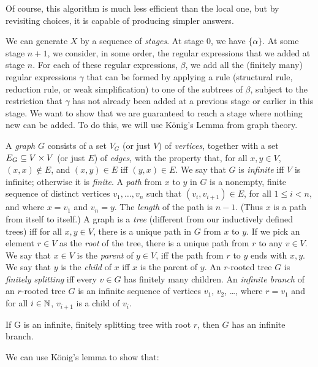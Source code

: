 Of course, this algorithm is much less efficient than the local one,
but by revisiting choices, it is capable of producing simpler answers.

We can generate $X$ by a sequence of \emph{stages}. At stage $0$, we
have $\{\alpha\}$. At some stage $n+1$, we consider, in some order,
the regular expressions that we added at stage $n$. For each of these
regular expressions, $\beta$, we add all the (finitely many) regular
expressions $\gamma$ that can be formed by applying a rule (structural
rule, reduction rule, or weak simplification) to one of the subtrees
of $\beta$, subject to the restriction that $\gamma$ has not already
been added at a previous stage or earlier in this stage.  We want to
show that we are guaranteed to reach a stage where nothing new can be
added. To do this, we will use K\"onig's Lemma
%
from graph theory.

A \emph{graph} $G$ consists of a set $V_G$ (or just $V$) of
\emph{vertices}, together with a set $E_G\subseteq V\times V$ (or just $E$) of
\emph{edges}, with the property that, for all $x, y\in V$,
$(x, x)\not\in E$, and $(x,y)\in E$ iff $(y, x)\in E$.  We say that
$G$ is \emph{infinite} iff $V$ is infinite; otherwise it is
\emph{finite}.  A \emph{path} from $x$ to $y$ in $G$ is a nonempty,
finite sequence of distinct vertices $v_1,\ldots,v_n$ such that
$(v_i, v_{i + 1})\in E$, for all $1\leq i < n$, and where $x = v_1$
and $v_n = y$. The \emph{length} of the path is $n-1$.  (Thus $x$ is a
path from itself to itself.) A graph is a \emph{tree} (different from
our inductively defined trees) iff for all $x,y\in V$, there is a
unique path in $G$ from $x$ to $y$. If we pick an element $r\in V$ as
the \emph{root} of the tree, there is a unique path from $r$ to any
$v\in V$. We say that $x\in V$ is the \emph{parent} of $y\in V$, iff
the path from $r$ to $y$ ends with $x, y$. We say that $y$ is the
\emph{child} of $x$ iff $x$ is the parent of $y$.  An $r$-rooted tree
$G$ is \emph{finitely splitting} iff every $v\in G$ has finitely many
children.  An \emph{infinite branch} of an $r$-rooted tree $G$ is an
infinite sequence of vertices $v_1$, $v_2$, \ldots, where $r = v_1$
and for all $i\in\mathbb{N}$, $v_{i+1}$ is a child of $v_i$.

\begin{lemma}
If G is an infinite, finitely splitting tree with root $r$,
then $G$ has an infinite branch.
\end{lemma}

We can use K\"onig's lemma to show that:

